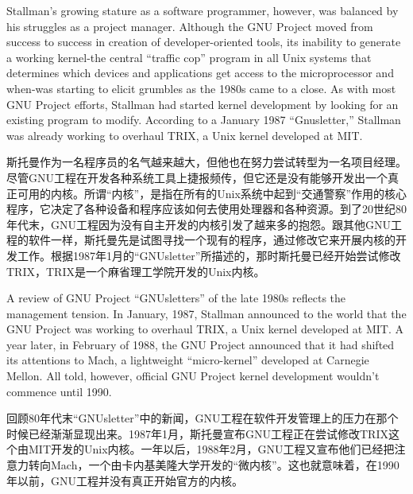\ifdefined\eng
Stallman's growing stature as a software programmer, however, was balanced by his struggles as a project manager. Although the GNU Project moved from success to success in creation of developer-oriented tools, its inability to generate a working kernel-the central ``traffic cop'' program in all Unix systems that determines which devices and applications get access to the microprocessor and when-was starting to elicit grumbles as the 1980s came to a close. As with most GNU Project efforts, Stallman had started kernel development by looking for an existing program to modify. According to a January 1987 ``Gnusletter,'' Stallman was already working to overhaul TRIX, a Unix kernel developed at MIT.
\fi

\ifdefined\chs
斯托曼作为一名程序员的名气越来越大，但他也在努力尝试转型为一名项目经理。尽管GNU工程在开发各种系统工具上捷报频传，但它还是没有能够开发出一个真正可用的内核。所谓``内核''，是指在所有的Unix系统中起到``交通警察''作用的核心程序，它决定了各种设备和程序应该如何去使用处理器和各种资源。到了20世纪80年代末，GNU工程因为没有自主开发的内核引发了越来多的抱怨。跟其他GNU工程的软件一样，斯托曼先是试图寻找一个现有的程序，通过修改它来开展内核的开发工作。根据1987年1月的``GNUsletter''所描述的，那时斯托曼已经开始尝试修改TRIX，TRIX是一个麻省理工学院开发的Unix内核。
\fi

\ifdefined\eng
A review of GNU Project ``GNUsletters'' of the late 1980s reflects the management tension. In January, 1987, Stallman announced to the world that the GNU Project was working to overhaul TRIX, a Unix kernel developed at MIT. A year later, in February of 1988, the GNU Project announced that it had shifted its attentions to Mach, a lightweight ``micro-kernel'' developed at Carnegie Mellon. All told, however, official GNU Project kernel development wouldn't commence until 1990. 
\fi

\ifdefined\chs
回顾80年代末``GNUsletter''中的新闻，GNU工程在软件开发管理上的压力在那个时候已经渐渐显现出来。1987年1月，斯托曼宣布GNU工程正在尝试修改TRIX这个由MIT开发的Unix内核。一年以后，1988年2月，GNU工程又宣布他们已经把注意力转向Mach，一个由卡内基美隆大学开发的``微内核''。这也就意味着，在1990年以前，GNU工程并没有真正开始官方的内核。
\fi

